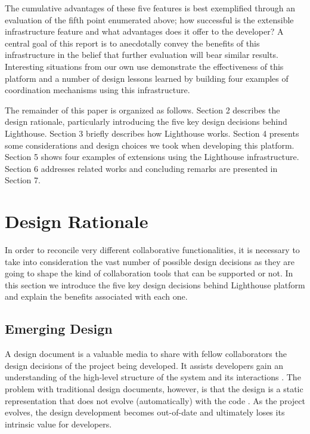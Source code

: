 \documentclass[10pt, conference, compsocconf]{IEEEtran}
\begin{document}
The cumulative advantages of these five features is best exemplified through an evaluation of the fifth point enumerated above; how successful is the extensible infrastructure feature and what advantages does it offer to the
developer? A central goal of this report is to anecdotally convey the benefits of this infrastructure in the belief that further evaluation will bear similar results. Interesting situations from our own use demonstrate the effectiveness of this platform and a number of design lessons learned by building four examples of coordination mechanisms using this infrastructure. 

The remainder of this paper is organized as follows.  Section 2 describes the design rationale, particularly
introducing the five key design decisions behind Lighthouse. Section 3 briefly describes how Lighthouse works.
Section 4 presents some considerations and design choices we took when developing this platform. Section 5 shows four examples of extensions using the Lighthouse infrastructure. Section 6 addresses related works and concluding
remarks are presented in Section 7.

\section{Design Rationale}

In order to reconcile very different collaborative functionalities, it is necessary to take into consideration the vast number of possible design decisions as they are going to shape the kind of collaboration tools that can be supported or not. In this section we introduce the five key design decisions behind Lighthouse platform and explain the benefits associated with each one.

\subsection{Emerging Design}

A design document is a valuable media to share with fellow collaborators the design decisions of the project being developed. It assists developers gain an understanding of the high-level structure of the system and its interactions \cite{Chen:2006}. The problem with traditional design documents, however, is that the design is a static representation that does not evolve (automatically) with the code \cite{Proenca:2009:UED}.  As the project evolves, the design development becomes out-of-date and ultimately loses its intrinsic value for developers.
\end{document}

